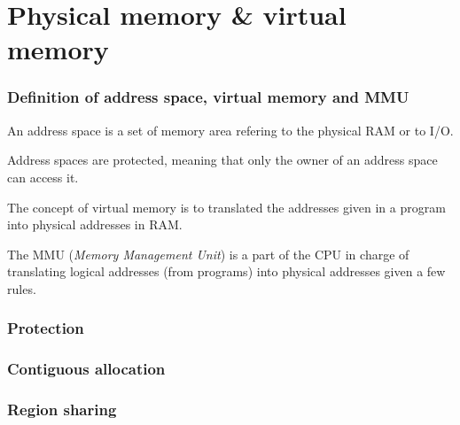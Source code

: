 %
%

\section{Physical memory \& virtual memory}


\begin{frame}
  \frametitle{Definition of address space, virtual memory and MMU}

  An address space is a set of memory area refering to the physical
  RAM or to I/O.

  \-

  Address spaces are protected, meaning that only the owner of an
  address space can access it.

  \-

  The concept of virtual memory is to translated the addresses given
  in a program into physical addresses in RAM.

  \-

  The MMU (\emph{Memory Management Unit}) is a part of the CPU in
  charge of translating logical addresses (from programs) into
  physical addresses given a few rules.

\end{frame}


\begin{frame}
  \frametitle{Protection}

  \begin{center}
  \end{center}

\end{frame}


\begin{frame}
  \frametitle{Contiguous allocation}

  \begin{center}
  \end{center}

\end{frame}


\begin{frame}
  \frametitle{Region sharing}

  \begin{center}
  \end{center}

\end{frame}

